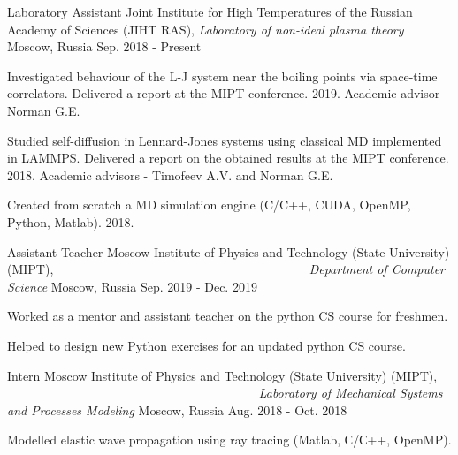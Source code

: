 

\begin{cventries}

  \cventry
    {Laboratory Assistant} %
    {Joint Institute for High Temperatures of the Russian Academy of Sciences (JIHT RAS), \textit{Laboratory of non-ideal plasma theory}} %
    {Moscow, Russia} %
    {Sep. 2018 - Present} %
    {
      \begin{cvitems} %
        \item {Investigated behaviour of the L-J system near the boiling points via space-time correlators. Delivered a report at the MIPT conference. 2019. Academic advisor - Norman G.E.}
      	\item {Studied self-diffusion in Lennard-Jones systems using classical MD implemented in LAMMPS. Delivered a report on the obtained results at the MIPT conference. 2018. Academic advisors - Timofeev A.V. and Norman G.E. }
      	\item {Created from scratch a MD simulation engine (C/C++, CUDA, OpenMP, Python, Matlab).  2018.}
      \end{cvitems}
    }

  \cventry
    {Assistant Teacher} %
    {Moscow Institute of Physics and Technology (State University) (MIPT), ~~~~~~~~~~~~~~~~~~~~~~~~~~~~~~~~~~~~~~~~ \textit{Department of Computer Science}} %
    {Moscow, Russia} %
    {Sep. 2019 - Dec. 2019} %
    {
      \begin{cvitems} %
        \item {Worked as a mentor and assistant teacher on the python CS course for freshmen.}
        \item {Helped to design new Python exercises for an updated python CS course.}
      \end{cvitems}
    }

  \cventry
    {Intern} %
    {Moscow Institute of Physics and Technology (State University) (MIPT), ~~~~~~~~~~~~~~~~~~~~~~~~~~~~~~~~~~~~~~~~ \textit{Laboratory of Mechanical Systems and Processes Modeling}} %
    {Moscow, Russia} %
    {Aug. 2018 - Oct. 2018} %
    {
      \begin{cvitems} %
        \item {Modelled elastic wave propagation using ray tracing (Matlab, С/С++, OpenMP).}
      \end{cvitems}
    }

\end{cventries}
